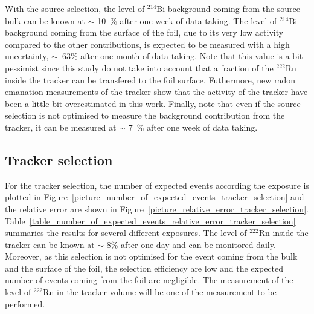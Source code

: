 \documentclass[main.tex]{subfiles}
\begin{document}
\bigskip

\noindent With the source selection, the level of $^{\text{214}}$Bi background coming from the source bulk can be known at $\sim$ 10~\% after one week of data taking. The level of $^{\text{214}}$Bi background coming from the surface of the foil, due to its very low activity compared to the other contributions, is expected to be measured with a high uncertainty, $\sim$~63\% after one month of data taking. Note that this value is a bit pessimist since this study do not take into account that a fraction of the $^{\text{222}}$Rn inside the tracker can be transfered to the foil surface. Futhermore, new radon emanation  measurements of the tracker show that the activity of the tracker have been a little bit overestimated in this work. Finally, note that even if the source selection is not optimised to measure the background contribution from the tracker, it can be measured at $\sim$ 7~\% after one week of data taking.  


\FloatBarrier


\subsection{Tracker selection}


\noindent For the tracker selection, the number of expected events according the exposure is plotted in Figure~\ref{picture_number_of_expected_events_tracker_selection} and the relative error are shown in Figure~\ref{picture_relative_error_tracker_selection}. Table~\ref{table_number_of_expected_events_relative_error_tracker_selection} summaries the results for several different exposures. The level of $^{\text{222}}$Rn inside the tracker can be known at $\sim$ 8\% after one day and can be monitored daily. Moreover, as this selection is not optimised for the event coming from the bulk and the surface of the foil, the selection efficiency are low and the expected number of events coming from the foil are negligible. The measurement of the level of $^{\text{222}}$Rn in the tracker volume will be one of the measurement to be performed.


 
\end{document}
